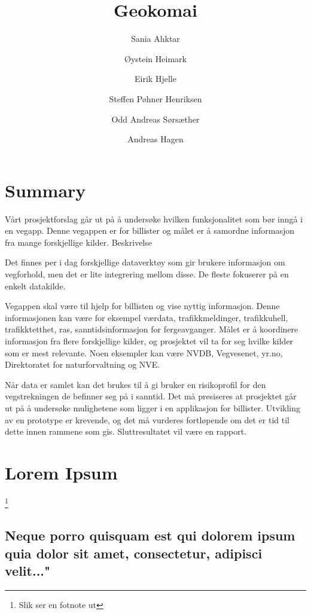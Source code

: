 \documentclass[titlepage,norsk]{article}
\title{Geokomai}
\author{ Sania Ahktar \and Øystein Heimark \and Eirik Hjelle
		\and Steffen Pøhner Henriksen \and Odd Andreas Sørsæther \and Andreas Hagen}
\begin{document}
\maketitle


\section{Summary}


Vårt prosjektforslag går ut på å undersøke hvilken funksjonalitet som bør inngå i en vegapp. Denne vegappen er for billister og målet er å samordne informasjon fra mange forskjellige kilder. 
Beskrivelse

Det finnes per i dag forskjellige dataverktøy som gir brukere informasjon om vegforhold, men det er lite integrering mellom disse. De fleste fokuserer på en enkelt datakilde.

Vegappen skal være til hjelp for billisten og vise nyttig informasjon. Denne informasjonen kan være for eksempel værdata, trafikkmeldinger, trafikkuhell, trafikktetthet, ras, sanntidsinformasjon for fergeavganger. Målet er å koordinere informasjon fra flere forskjellige kilder, og prosjektet vil ta for seg hvilke kilder som er mest relevante. Noen eksempler kan være NVDB, Vegvesenet, yr.no, Direktoratet for naturforvaltning og NVE. 

Når data er samlet kan det brukes til å gi bruker en risikoprofil for den vegstrekningen de befinner seg på i sanntid. Det må presiseres at prosjektet går ut på å undersøke mulighetene som ligger i en applikasjon for billister. Utvikling av en prototype er krevende, og det må vurderes fortløpende om det er tid til dette innen rammene som gis. Sluttresultatet vil være en rapport. 

\newpage

\section{Lorem Ipsum}

\footnote{Slik ser en fotnote ut}

\subsection{Neque porro quisquam est qui dolorem ipsum quia dolor sit amet, consectetur, adipisci velit..."}
\end{document}
